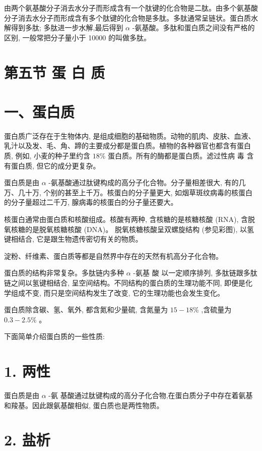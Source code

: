 \documentclass[10pt]{article}
\begin{document}
由两个氨基酸分子消去水分子而形成含有一个肽键的化合物是二肽。由多个氨基酸分子消去水分子而形成含有多个肽键的化合物是多肽。多肽通常呈链状。蛋白质水解得到多肽; 多肽进一步水解,最后得到 \(\alpha\) -氨基酸。多肽和蛋白质之间没有严格的区别, 一般常把分子量小于 10000 的叫做多肽。

\section*{第五节 蛋 白 质}

\section*{一、蛋白质}

蛋白质广泛存在于生物体内, 是组成细胞的基础物质。动物的肌肉、皮肤、血液、乳汁以及发、毛、角、蹄的主要成分都是蛋白质。植物的各种器官也都含有蛋白质, 例如, 小麦的种子里约含 \({18}\%\) 蛋白质。所有的酶都是蛋白质。滤过性病 毒 含有蛋白质, 但它的成分更复杂。

蛋白质是由 \(\alpha\) -氨基酸通过肽键构成的高分子化合物。分子量相差很大, 有的几万、几十万, 个别的甚至上千万。核蛋白的分子量更大, 如烟草斑纹病毒的核蛋白的分子量超过二千万, 腺病毒的核蛋白的分子量还要大。

核蛋白通常由蛋白质和核酸组成。核酸有两种, 含核糖的是核糖核酸 (RNA), 含脱氧核糖的是脱氧核糖核酸 (DNA)。 脱氧核糖核酸呈双螺旋结构 (参见彩图), 以氢键相结合, 它是跟生物遗传密切有关的物质。

淀粉、纤维素、蛋白质等都是自然界中存在的天然有机高分子化合物。

蛋白质的结构非常复杂。多肽链内多种 \(\alpha\) -氨基 酸 以一定顺序排列, 多肽链跟多肽链之间以氢键相结合, 呈空间结构。不同结构的蛋白质的生理功能不同, 即便是化学组成不变, 而只是空间结构发生了改变, 它的生理功能也会发生变化。

蛋白质除含碳、氢、氧外, 都含氮和少量硫, 含氮量为 \({15} - {18}\%\) ,含硫量为 \({0.3} - {2.5}\%\) 。

下面简单介绍蛋白质的一些性质:

\section*{1. 两性}

蛋白质是由 \(\alpha\) -氨 基酸通过肽键构成的高分子化合物,在蛋白质分子中存在着氨基和羧基。因此跟氨基酸相似, 蛋白质也是两性物质。

\section*{2. 盐析}
\end{document}
